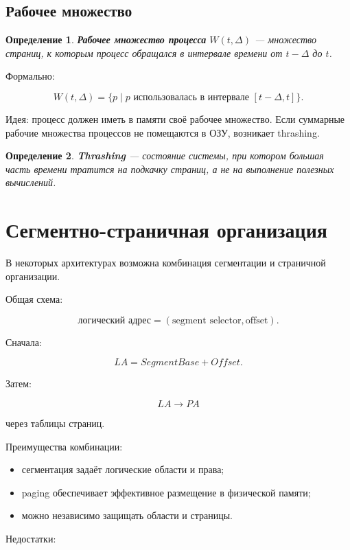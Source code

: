 \documentclass[a4paper,12pt]{article}
\newtheorem{definition}{Определение}
\begin{document}
\subsection{Рабочее множество}

\begin{definition}
\textbf{Рабочее множество процесса} $W(t,\Delta)$ --- множество страниц, к которым процесс обращался в интервале времени от $t-\Delta$ до $t$.
\end{definition}

Формально:

\[
W(t,\Delta)=\{p \mid p \text{ использовалась в интервале } [t-\Delta,t]\}.
\]

Идея: процесс должен иметь в памяти своё рабочее множество. Если суммарные рабочие множества процессов не помещаются в ОЗУ, возникает thrashing.

\begin{definition}
\textbf{Thrashing} --- состояние системы, при котором большая часть времени тратится на подкачку страниц, а не на выполнение полезных вычислений.
\end{definition}

\section{Сегментно-страничная организация}

В некоторых архитектурах возможна комбинация сегментации и страничной организации.

Общая схема:

\[
\text{логический адрес}
=
(\text{segment selector}, \text{offset}).
\]

Сначала:

\[
LA = SegmentBase + Offset.
\]

Затем:

\[
LA \rightarrow PA
\]

через таблицы страниц.

Преимущества комбинации:

\begin{itemize}
    \item сегментация задаёт логические области и права;
    \item paging обеспечивает эффективное размещение в физической памяти;
    \item можно независимо защищать области и страницы.
\end{itemize}

Недостатки:
\end{document}
